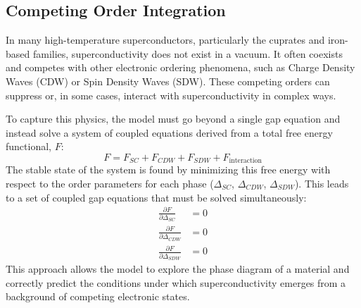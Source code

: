 \subsection{Competing Order Integration}
In many high-temperature superconductors, particularly the cuprates and iron-based families, superconductivity does not exist in a vacuum. It often coexists and competes with other electronic ordering phenomena, such as Charge Density Waves (CDW) or Spin Density Waves (SDW). These competing orders can suppress or, in some cases, interact with superconductivity in complex ways.

To capture this physics, the model must go beyond a single gap equation and instead solve a system of coupled equations derived from a total free energy functional, $F$:
\begin{equation}
F = F_{SC} + F_{CDW} + F_{SDW} + F_{\text{interaction}}
\end{equation}
The stable state of the system is found by minimizing this free energy with respect to the order parameters for each phase ($\Delta_{SC}$, $\Delta_{CDW}$, $\Delta_{SDW}$). This leads to a set of coupled gap equations that must be solved simultaneously:
\begin{align}
\frac{\partial F}{\partial\Delta_{SC}} &= 0 \\
\frac{\partial F}{\partial\Delta_{CDW}} &= 0 \\
\frac{\partial F}{\partial\Delta_{SDW}} &= 0
\end{align}
This approach allows the model to explore the phase diagram of a material and correctly predict the conditions under which superconductivity emerges from a background of competing electronic states.
